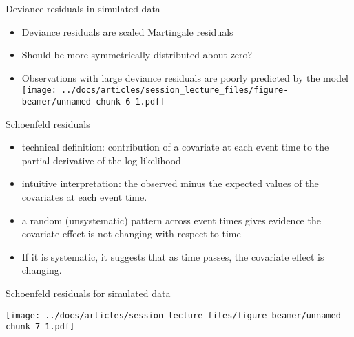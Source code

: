 \documentclass[
  ignorenonframetext,
]{beamer}
\providecommand{\tightlist}{%
  \setlength{\itemsep}{0pt}\setlength{\parskip}{0pt}}
\begin{document}
\begin{frame}{Deviance residuals in simulated data}
\protect\hypertarget{deviance-residuals-in-simulated-data}{}

\begin{itemize}
\tightlist
\item
  Deviance residuals are scaled Martingale residuals
\item
  Should be more symmetrically distributed about zero?
\item
  Observations with large deviance residuals are poorly predicted by the
  model
  \texttt{[image: ../docs/articles/session\_lecture\_files/figure-beamer/unnamed-chunk-6-1.pdf]}
\end{itemize}

\end{frame}

\begin{frame}{Schoenfeld residuals}
\protect\hypertarget{schoenfeld-residuals}{}

\begin{itemize}
\tightlist
\item
  technical definition: contribution of a covariate at each event time
  to the partial derivative of the log-likelihood
\item
  intuitive interpretation: the observed minus the expected values of
  the covariates at each event time.
\item
  a random (unsystematic) pattern across event times gives evidence the
  covariate effect is not changing with respect to time
\item
  If it is systematic, it suggests that as time passes, the covariate
  effect is changing.
\end{itemize}

\end{frame}

\begin{frame}{Schoenfeld residuals for simulated data}
\protect\hypertarget{schoenfeld-residuals-for-simulated-data}{}

\texttt{[image: ../docs/articles/session\_lecture\_files/figure-beamer/unnamed-chunk-7-1.pdf]}

\end{frame}
\end{document}
